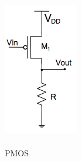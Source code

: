 \documentclass[pdftex,12pt,a4paper]{report}
\begin{document}
\begin{figure}[!htb]
  \includegraphics[width=\linewidth]{Imagens/PMOS.png}
  \caption{\\PMOS}\label{fig:fig_pmos}
\endminipage\hfill
{}

\end{figure}
\end{document}
